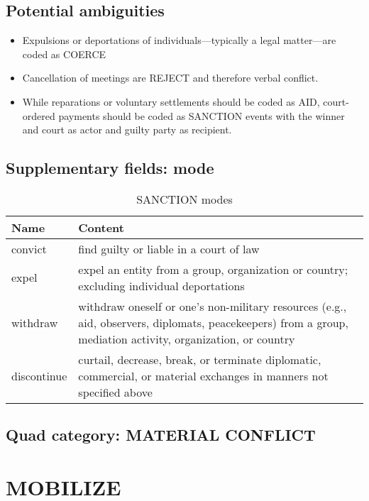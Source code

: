 \documentclass[11pt]{report}
\newcommand{\plcat}[1]{\textsf{#1}}
\begin{document}
\subsection{Potential ambiguities}

\begin{itemize}
\item Expulsions or deportations of individuals---typically a legal matter---are coded as \plcat{COERCE}
\item Cancellation of meetings are \plcat{REJECT} and therefore verbal conflict.
\item While reparations or voluntary settlements should be coded as \plcat{AID}, court-ordered payments should be coded as \plcat{SANCTION} events with the winner and court as actor and guilty party as recipient.
\end{itemize}

\subsection{Supplementary fields: mode}

\begin{table}[htp]
\caption{SANCTION modes}
\begin{center}
\begin{tabular}{|l|p{13cm}|}
\hline
Name & Content \\
\hline
convict & find guilty or liable in a court of law\\
expel & expel an entity from a group, organization or country; excluding individual deportations \\
withdraw & withdraw oneself or one's non-military resources (e.g., aid, observers, diplomats, peacekeepers) from a group, mediation activity, organization, or country\\
discontinue & curtail, decrease, break, or terminate diplomatic, commercial, or material exchanges in manners not specified above \\
\hline
\end{tabular}
\end{center}
\label{tab:sanctionmode}
\end{table}%

\subsection{Quad category: MATERIAL CONFLICT}

\newpage

\section{MOBILIZE}
\end{document}
